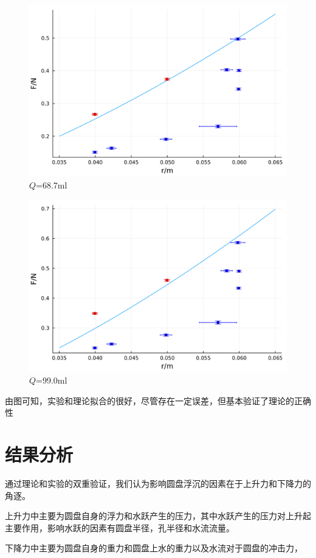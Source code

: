 \documentclass[UTF8]{gapd}
\begin{document}
\begin{figure}[!htbp]%
  \centering
  \includegraphics[width=0.8\columnwidth]{images/68.7.png}
  \caption{$Q$=68.7ml}
  \label{fig:unsinkable_disc_68.7}%
\end{figure}

\begin{figure}[!htbp]%
  \centering
  \includegraphics[width=0.8\columnwidth]{images/99.0.png}
  \caption{$Q$=99.0ml}
  \label{fig:unsinkable_disc_99.0}%
\end{figure}

由图可知，实验和理论拟合的很好，尽管存在一定误差，但基本验证了理论的正确性

\section{结果分析}
通过理论和实验的双重验证，我们认为影响圆盘浮沉的因素在于上升力和下降力的角逐。

上升力中主要为圆盘自身的浮力和水跃产生的压力，其中水跃产生的压力对上升起主要作用，影响水跃的因素有圆盘半径，孔半径和水流流量。

下降力中主要为圆盘自身的重力和圆盘上水的重力以及水流对于圆盘的冲击力，
\end{document}
